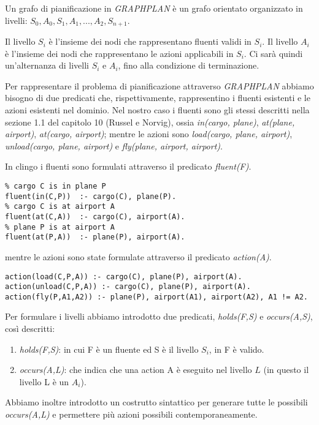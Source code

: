 Un grafo di pianificazione in \emph{GRAPHPLAN} è un grafo orientato organizzato in livelli: $S_0, A_0, S_1, A_1, ... , A_2, S_{n+1}$.

Il livello $S_i$ è l'insieme dei nodi che rappresentano fluenti validi in $S_i$. Il livello $A_i$ è l'insieme dei nodi che rappresentano le azioni applicabili in $S_i$. Ci sarà quindi un'alternanza di livelli $S_i$ e $A_i$, fino alla condizione di terminazione.

Per rappresentare il problema di pianificazione attraverso \emph{GRAPHPLAN} abbiamo bisogno di due predicati che, rispettivamente, rappresentino i fluenti esistenti e le azioni esistenti nel dominio. Nel nostro caso i fluenti sono gli stessi descritti nella sezione 1.1 del capitolo 10 (Russel e Norvig), ossia \emph{in(cargo, plane)}, \emph{at(plane, airport)}, \emph{at(cargo, airport)}; mentre le azioni sono \emph{load(cargo, plane, airport)}, \emph{unload(cargo, plane, airport)} e \emph{fly(plane, airport, airport)}.

In clingo i fluenti sono formulati attraverso il predicato \emph{fluent(F)}.

\begin{lstlisting}
% cargo C is in plane P
fluent(in(C,P))  :- cargo(C), plane(P).
% cargo C is at airport A
fluent(at(C,A))  :- cargo(C), airport(A).
% plane P is at airport A
fluent(at(P,A))  :- plane(P), airport(A).
\end{lstlisting}

mentre le azioni sono state formulate attraverso il predicato \emph{action(A)}.

\begin{lstlisting}
action(load(C,P,A)) :- cargo(C), plane(P), airport(A).
action(unload(C,P,A)) :- cargo(C), plane(P), airport(A).
action(fly(P,A1,A2)) :- plane(P), airport(A1), airport(A2), A1 != A2.
\end{lstlisting}

Per formulare i livelli abbiamo introdotto due predicati, \emph{holds(F,S)} e \emph{occurs(A,S)}, così descritti:

\begin{enumerate}
\item \emph{holds(F,S)}: in cui F è un fluente ed S è il livello $S_i$, in F è valido.
\item \emph{occurs(A,L)}: che indica che una action A è eseguito nel livello $L$ (in questo il livello L è un $A_i$).
\end{enumerate}

Abbiamo inoltre introdotto un costrutto sintattico per generare tutte le possibili \emph{occurs(A,L)} e permettere più azioni possibili contemporaneamente.

